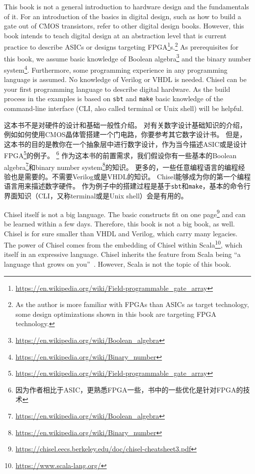 \documentclass[%
    10pt,
    headinclude, footexclude,
    openright, %
    notitlepage,
    cleardoubleempty,
    headsepline,
    pointlessnumbers,
    bibtotoc, idxtotoc,
    ]{scrbook}
\newcommand{\code}[1]{{\small{\texttt{#1}}}}
\newcommand{\myref}[2]{\href{#1}{#2}}
\renewcommand{\myref}[2]{{#2}{\footnote{\url{#1}}}}
\begin{document}
This book is not a general introduction to hardware design and the fundamentals of it.
For an introduction of the basics in digital design, such as how to build a gate out of
CMOS transistors, refer to other digital design books.
However, this book intends to teach digital design at an abstraction level that is
current practice to describe ASICs or designs targeting
\myref{https://en.wikipedia.org/wiki/Field-programmable_gate_array}{FPGA}s.\footnote{As the author is more familiar with FPGAs
than ASICs as target technology, some design optimizations shown in this book are
targeting FPGA technology.}
As prerequisites for this book, we assume basic knowledge of
\myref{https://en.wikipedia.org/wiki/Boolean_algebra}{Boolean algebra} and the
\myref{https://en.wikipedia.org/wiki/Binary_number}{binary number system}.
Furthermore, some programming experience in any programming language
is assumed. No knowledge of Verilog or VHDL is needed.
Chisel can be your first programming language to describe digital hardware.
As the build process in the examples is based on \code{sbt} and \code{make}
basic knowledge of the command-line interface (CLI, also called terminal or
Unix shell) will be helpful.

这本书不是对硬件的设计和基础一般性介绍。
对有关数字设计基础知识的介绍，例如如何使用CMOS晶体管搭建一个门电路，你要参考其它数字设计书。
但是，这本书的目的是教你在一个抽象层中进行数字设计，作为当今描述ASIC或是设计
\myref{https://en.wikipedia.org/wiki/Field-programmable_gate_array}{FPGA}的例子。
\footnote{因为作者相比于ASIC，更熟悉FPGA一些，书中的一些优化是针对FPGA的技术}
作为这本书的前置需求，我们假设你有一些基本的\myref{https://en.wikipedia.org/wiki/Boolean_algebra}{Boolean algebra}和\myref{https://en.wikipedia.org/wiki/Binary_number}{binary number system}的知识。
更多的，一些任意编程语言的编程经验也是需要的。不需要Verilog或是VHDL的知识。
Chisel能够成为你的第一个编程语言用来描述数字硬件。
作为例子中的搭建过程是基于\code{sbt}和\code{make}，基本的命令行界面知识（CLI，又称terminal或是Unix shell）会是有用的。

Chisel itself is not a big language. The basic constructs fit on
\myref{https://chisel.eecs.berkeley.edu/doc/chisel-cheatsheet3.pdf}{one page}
and can be learned within a few days.
Therefore, this book is not a big book, as well.
Chisel is for sure smaller than VHDL and Verilog, which carry many legacies.
The power of Chisel comes from the embedding of Chisel within
\myref{https://www.scala-lang.org/}{Scala}, which itself in an expressive language.
Chisel inherits the feature from Scala being ``a language that grows on you''~\cite{Scala}.
However, Scala is not the topic of this book.
\end{document}
